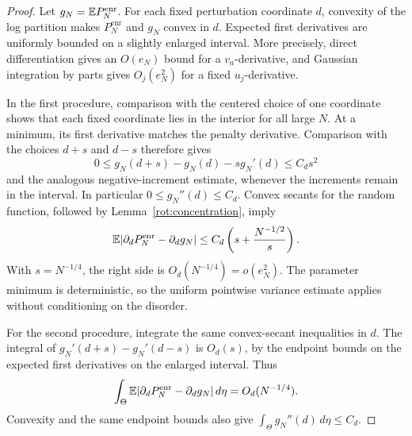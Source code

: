 \begin{proof}
Let \(g_N=\mathbb E P_N^{\mathrm{enr}}\).
For each fixed perturbation coordinate \(d\), convexity of the log
partition makes \(P_N^{\mathrm{enr}}\) and \(g_N\) convex in \(d\).
Expected first derivatives are uniformly bounded on a slightly
enlarged interval.  More precisely, direct differentiation gives
an \(O(e_N)\) bound for a \(v_a\)-derivative, and Gaussian integration
by parts gives \(O_j(e_N^2)\) for a fixed \(u_j\)-derivative.

In the first procedure, comparison with the centered choice of one
coordinate shows that each fixed coordinate lies in the interior
for all large \(N\).  At a minimum, its first derivative matches the
penalty derivative.  Comparison with the choices \(d+s\) and \(d-s\)
therefore gives
\[
 0\le g_N(d+s)-g_N(d)-s g_N'(d)\le C_d s^2
\]
and the analogous negative-increment estimate, whenever the
increments remain in the interval.  In particular
\(0\le g_N''(d)\le C_d\).  Convex secants for the random function,
followed by Lemma~\ref{rot:concentration}, imply
\[
 \mathbb E|\partial_dP_N^{\mathrm{enr}}-\partial_dg_N|
 \le C_d\left(s+\frac{N^{-1/2}}s\right).
\]
With \(s=N^{-1/4}\), the right side is \(O_d(N^{-1/4})=o(e_N^2)\).
The parameter minimum is deterministic, so the uniform pointwise
variance estimate applies without conditioning on the disorder.

For the second procedure, integrate the same convex-secant
inequalities in \(d\).  The integral of
\(g_N'(d+s)-g_N'(d-s)\) is \(O_d(s)\), by the endpoint bounds on
the expected first derivatives on the enlarged interval.
Thus
\begin{equation}\label{rot:derivative-fluctuation}
 \int_\Theta
 \mathbb E|\partial_dP_N^{\mathrm{enr}}-\partial_dg_N|\,d\eta
 =O_d(N^{-1/4}).
\end{equation}
Convexity and the same endpoint bounds also give
\(\int_\Theta g_N''(d)\,d\eta\le C_d\).


\end{proof}
